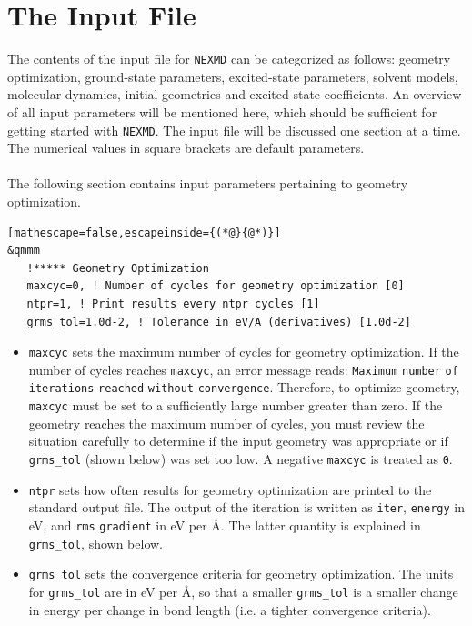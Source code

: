 \documentclass[letterpaper,12pt,titlepage]{article}
\begin{document}
\newpage
\section{The Input File}
 
The contents of the input file for \verb+NEXMD+ can be categorized as follows: geometry optimization, ground-state parameters, excited-state parameters, solvent models, molecular dynamics, initial geometries and excited-state coefficients.  An overview of all input parameters will be mentioned here, which should be sufficient for getting started with \verb+NEXMD+.  The input file will be discussed one section at a time.  The numerical values in square brackets are default parameters.
\\
\\
The following section contains input parameters pertaining to geometry optimization.
\begin{lstlisting}[mathescape=false,escapeinside={(*@}{@*)}]
&qmmm
   !***** Geometry Optimization
   maxcyc=0, ! Number of cycles for geometry optimization [0]
   ntpr=1, ! Print results every ntpr cycles [1]
   grms_tol=1.0d-2, ! Tolerance in eV/A (derivatives) [1.0d-2]
\end{lstlisting}
\begin{itemize}
\item \verb+maxcyc+ sets the maximum number of cycles for geometry optimization.  If the number of cycles reaches \verb+maxcyc+, an error message reads: \verb+Maximum+ \verb+number+ \verb+of+ \verb+iterations+ \verb+reached+ \verb+without+ \verb+convergence+.  Therefore,  to optimize geometry, \verb+maxcyc+ must be set to a sufficiently large number greater than zero.  If the geometry reaches the maximum number of cycles, you must review the situation carefully to determine if the input geometry was appropriate or if \verb+grms_tol+ (shown below) was set too low.  A negative \verb+maxcyc+ is treated as \verb+0+.
\item \verb+ntpr+ sets how often results for geometry optimization are printed to the standard output file.  The output of the iteration is written as \verb+iter+, \verb+energy+ in eV, and \verb+rms+ \verb+gradient+ in eV per \AA.  The latter quantity is explained in \verb+grms_tol+, shown below.
\item \verb+grms_tol+ sets the convergence criteria for geometry optimization.  The units for \verb+grms_tol+ are in eV per \AA, so that a smaller \verb+grms_tol+ is a smaller change in energy per change in bond length (i.e. a tighter convergence criteria).
\end{itemize}
\end{document}

